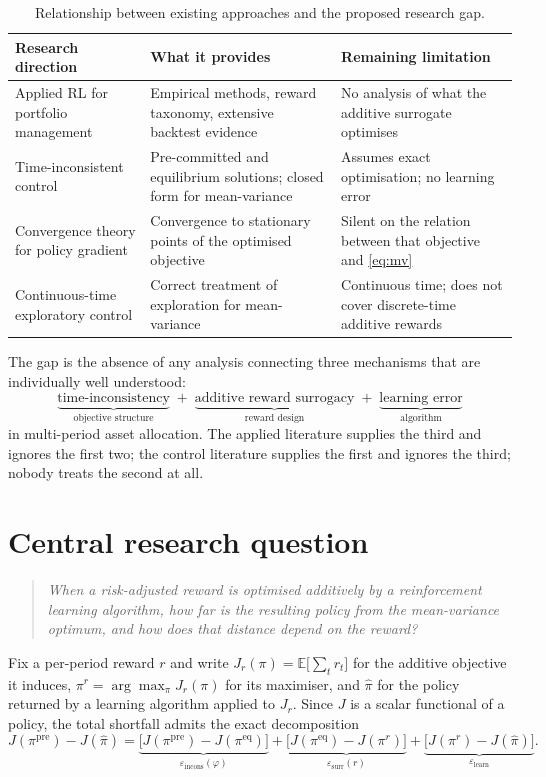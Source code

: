 \documentclass[11pt,a4paper]{article}
\theoremstyle{plain}
\theoremstyle{definition}
\newcommand{\E}{\mathbb{E}}
\newcommand{\pipre}{\pi^{\mathrm{pre}}}
\newcommand{\pieq}{\pi^{\mathrm{eq}}}
\newcommand{\pir}{\pi^{r}}
\newcommand{\pihat}{\widehat{\pi}}
\newcommand{\epsincons}{\varepsilon_{\mathrm{incons}}}
\newcommand{\epssurr}{\varepsilon_{\mathrm{surr}}}
\newcommand{\epslearn}{\varepsilon_{\mathrm{learn}}}
\begin{document}
\begin{table}[h]
\centering
\small
\begin{tabular}{p{3.5cm}p{5.2cm}p{5.2cm}}
\toprule
\textbf{Research direction} & \textbf{What it provides} & \textbf{Remaining limitation}\\
\midrule
Applied RL for portfolio management
& Empirical methods, reward taxonomy, extensive backtest evidence
& No analysis of what the additive surrogate optimises\\[0.4em]
Time-inconsistent control
& Pre-committed and equilibrium solutions; closed form for mean-variance
& Assumes exact optimisation; no learning error\\[0.4em]
Convergence theory for policy gradient
& Convergence to stationary points of the optimised objective
& Silent on the relation between that objective and \eqref{eq:mv}\\[0.4em]
Continuous-time exploratory control
& Correct treatment of exploration for mean-variance
& Continuous time; does not cover discrete-time additive rewards\\
\bottomrule
\end{tabular}
\caption{Relationship between existing approaches and the proposed research gap.}
\end{table}

\noindent
The gap is the absence of any analysis connecting three mechanisms that are individually
well understood:
\[
\underbrace{\text{time-inconsistency}}_{\text{objective structure}}
\;+\;
\underbrace{\text{additive reward surrogacy}}_{\text{reward design}}
\;+\;
\underbrace{\text{learning error}}_{\text{algorithm}}
\]
in multi-period asset allocation. The applied literature supplies the third and ignores
the first two; the control literature supplies the first and ignores the third; nobody
treats the second at all.

\section{Central research question}

\begin{quote}
\itshape
When a risk-adjusted reward is optimised additively by a reinforcement learning
algorithm, how far is the resulting policy from the mean-variance optimum, and how does
that distance depend on the reward?
\end{quote}

\noindent
Fix a per-period reward $r$ and write $J_r(\pi)=\E\bigl[\sum_t r_t\bigr]$ for the
additive objective it induces, $\pir=\arg\max_\pi J_r(\pi)$ for its maximiser, and
$\pihat$ for the policy returned by a learning algorithm applied to $J_r$. Since $J$ is
a scalar functional of a policy, the total shortfall admits the exact decomposition
\begin{equation}
J(\pipre)-J(\pihat)
=\underbrace{\bigl[J(\pipre)-J(\pieq)\bigr]}_{\epsincons(\varphi)}
+\underbrace{\bigl[J(\pieq)-J(\pir)\bigr]}_{\epssurr(r)}
+\underbrace{\bigl[J(\pir)-J(\pihat)\bigr]}_{\epslearn}.
\label{eq:decomp}
\end{equation}
\end{document}
